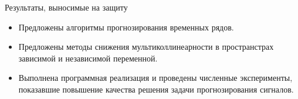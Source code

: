 \documentclass{beamer}
\begin{document}


\begin{frame}{Результаты, выносимые на защиту}
\begin{itemize}
  \item Предложены алгоритмы прогнозирования временных рядов.
  \smallskip
  \item Предложены методы снижения мультиколлинеарности в пространстрах зависимой и независимой переменной.
  \medskip
  \item Выполнена программная реализация и проведены численные эксперименты, показавшие повышение качества решения задачи прогнозирования сигналов.
\end{itemize}

\end{frame}
\end{document}
